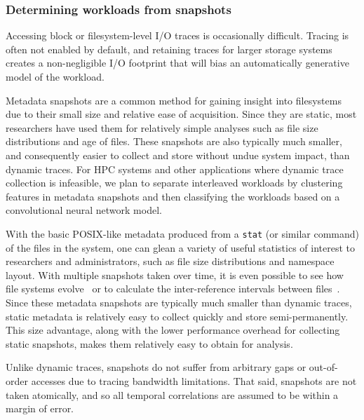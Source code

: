 \subsubsection*{Determining workloads from snapshots }

Accessing block or filesystem-level I/O traces is occasionally difficult.
Tracing is often not enabled by default, and retaining traces for larger storage
systems creates a non-negligible I/O footprint that will bias an automatically
generative model of the workload. 

Metadata snapshots are a common method for gaining insight into filesystems due
to their small size and relative ease of acquisition. Since they are static,
most researchers have used them for relatively simple analyses such as file size
distributions and age of files. These snapshots are also typically much smaller,
and consequently easier to collect and store without undue system impact, than
dynamic traces.  For HPC systems and other applications where dynamic trace
collection is infeasible, we plan to separate interleaved workloads by clustering features in metadata snapshots and then classifying the workloads based on a convolutional neural network model.

With the basic POSIX-like metadata produced from a \texttt{stat} (or similar
command) of the files in the system, one can glean
a variety of useful statistics of interest to researchers and administrators,
such as file size distributions and namespace layout. With multiple snapshots taken
over time, it is even possible to see how file systems
evolve~\cite{agrawal:fast07} or to calculate the inter-reference
intervals between files~\cite{gibson:cmg98}.
 Since these metadata snapshots are
typically much smaller than dynamic traces, static metadata is relatively easy
to collect quickly and store semi-permanently. This size advantage, along with
the lower performance overhead for collecting static snapshots, makes them
relatively easy to obtain for analysis.

Unlike dynamic traces, snapshots do not
suffer from arbitrary gaps or out-of-order accesses due to tracing bandwidth
limitations.  That said, snapshots are not taken atomically, and so all temporal
correlations are assumed to be within a margin of error. 

